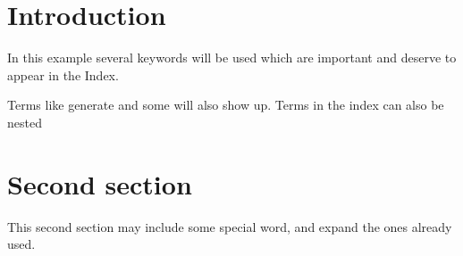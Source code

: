 \usepackage{imakeidx}
\makeindex[columns=3, title=Alphabetical Index, intoc]
 

 
\tableofcontents
 
\section{Introduction}
In this example several keywords will be 
used which are important and deserve to appear in the 
Index.
 
Terms like generate and some 
will also show up. Terms in the index can also be 
nested 
 
\clearpage
 
\section{Second section}
This second section may include some special 
word, and expand the ones already used.
 
\printindex

